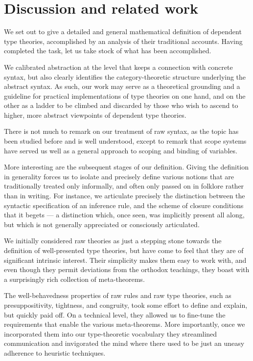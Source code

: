 \section{Discussion and related work}
\label{sec:discussion-and-related-work}


We set out to give a detailed and general mathematical definition of dependent type theories, accomplished by an analysis of their traditional accounts.
%
Having completed the task, let us take stock of what has been accomplished.

We calibrated abstraction at the level that keeps a connection with concrete syntax, but also clearly identifies the category-theoretic structure underlying the abstract syntax.
%
As such, our work may serve as a theoretical grounding and a guideline for practical implementations of type theories on one hand, and on the other as a ladder to be climbed and discarded by those who wish to ascend to higher, more abstract viewpoints of dependent type theories.

There is not much to remark on our treatment of raw syntax, as the topic has been studied before and is well understood, except to remark that scope systems have served us well as a general approach to scoping and binding of variables.

More interesting are the subsequent stages of our definition.
%
Giving the definition in generality forces us to isolate and precisely define various notions that are traditionally treated only informally, and often only passed on in folklore rather than in writing. 
%
For instance, we articulate precisely the distinction between the syntactic specification of an inference rule, and the scheme of closure conditions that it begets --- a distinction which, once seen, was implicitly present all along, but which is not generally appreciated or consciously articulated.

We initially considered raw theories as just a stepping stone towards the definition of well-presented type theories, but have come to feel that they are of significant intrinsic interest.
%
Their simplicity makes them easy to work with, and even though they permit deviations from the orthodox teachings, they boast with a surprisingly rich collection of meta-theorems.

The well-behavedness properties of raw rules and raw type theories, such as presuppositivity, tightness, and congruity, took some effort to define and explain, but quickly paid off.
%
On a technical level, they allowed us to fine-tune the requirements that enable the various meta-theorems.
%
More importantly, once we incorporated them into our type-theoretic vocabulary they streamlined communication and invigorated the mind where there used to be just an uneasy adherence to heuristic techniques.


